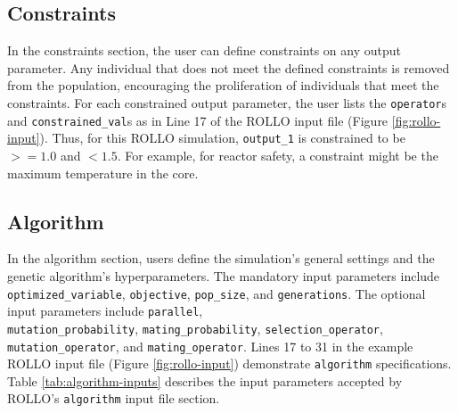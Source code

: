 \subsection{Constraints}
In the constraints section, the user can define constraints on any output parameter. 
Any individual that does not meet the defined constraints is removed from the 
population, encouraging the proliferation of individuals that meet the 
constraints. 
For each constrained output parameter, the user lists the \texttt{operator}s 
and \texttt{constrained\_val}s as in Line 17 of the \gls{ROLLO} input file 
(Figure \ref{fig:rollo-input}). 
Thus, for this \gls{ROLLO} simulation, \texttt{output\_1} is constrained to be 
$>= 1.0$ and $< 1.5$. 
For example, for reactor safety, a constraint might be the maximum temperature in the 
core.

\subsection{Algorithm}
In the algorithm section, users define the simulation's general settings and the
genetic algorithm's hyperparameters. 
The mandatory input parameters include \texttt{optimized\_variable}, \texttt{objective},
\texttt{pop\_size}, and \texttt{generations}.
The optional input parameters include \texttt{parallel}, \\
\texttt{mutation\_probability}, \texttt{mating\_probability}, 
\texttt{selection\_operator}, \texttt{mutation\_operator}, 
and \texttt{mating\_operator}. 
Lines 17 to 31 in the example \gls{ROLLO} input file (Figure \ref{fig:rollo-input}) 
demonstrate \texttt{algorithm} specifications. 
Table \ref{tab:algorithm-inputs} describes the input parameters accepted by
ROLLO's \texttt{algorithm} input file section.  
